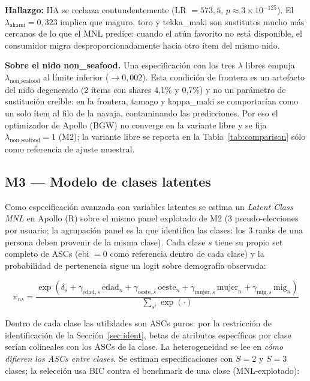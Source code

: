 \documentclass[12pt,a4paper]{article}
\begin{document}
\textbf{Hallazgo:} IIA se rechaza contundentemente (LR $= 573{,}5$, $p \approx 3 \times 10^{-125}$). El $\lambda_{\text{akami}} = 0{,}323$ implica que maguro, toro y tekka\_maki son sustitutos mucho más cercanos de lo que el MNL predice: cuando el atún favorito no está disponible, el consumidor migra desproporcionadamente hacia otro ítem del mismo nido.

\textbf{Sobre el nido non\_seafood.} Una especificación con los tres $\lambda$ libres empuja $\lambda_{\text{non\_seafood}}$ al límite inferior ($\to 0{,}002$). Esta condición de frontera es un artefacto del nido degenerado (2 ítems con shares 4,1\% y 0,7\%) y no un parámetro de sustitución creíble: en la frontera, tamago y kappa\_maki se comportarían como un solo ítem al filo de la navaja, contaminando las predicciones. Por eso el optimizador de Apollo (BGW) no converge en la variante libre y se fija $\lambda_{\text{non\_seafood}} = 1$ (M2); la variante libre se reporta en la Tabla~\ref{tab:comparison} sólo como referencia de ajuste muestral.

\subsection{M3 --- Modelo de clases latentes}
\label{sec:lc}

Como especificación avanzada con variables latentes se estima un \textit{Latent Class MNL} en Apollo (R) sobre el mismo panel explotado de M2 (3 pseudo-elecciones por usuario; la agrupación panel es la que identifica las clases: los 3 ranks de una persona deben provenir de la misma clase). Cada clase $s$ tiene su propio set completo de ASCs (ebi $= 0$ como referencia dentro de cada clase) y la probabilidad de pertenencia sigue un logit sobre demografía observada:

\begin{equation}
  \pi_{ns} = \frac{\exp(\delta_s + \gamma_{\text{edad},s}\,\text{edad}_n + \gamma_{\text{oeste},s}\,\text{oeste}_n + \gamma_{\text{mujer},s}\,\text{mujer}_n + \gamma_{\text{mig},s}\,\text{mig}_n)}{\sum_{s'}\exp(\cdot)}
  \label{eq:lc}
\end{equation}

Dentro de cada clase las utilidades son ASCs puros: por la restricción de identificación de la Sección~\ref{sec:ident}, betas de atributos específicos por clase serían colineales con los ASCs de la clase. La heterogeneidad se lee en \emph{cómo difieren los ASCs entre clases}. Se estiman especificaciones con $S = 2$ y $S = 3$ clases; la selección usa BIC contra el benchmark de una clase (MNL-explotado):
\end{document}
